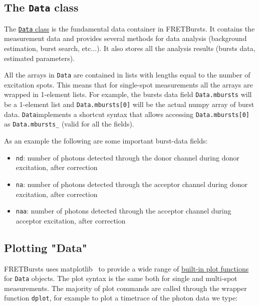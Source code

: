 \subsection{The \texttt{Data} class}
\label{sec:data_intro}

The
\href{http://fretbursts.readthedocs.org/en/latest/data_class.html}{\texttt{Data}
class} is the fundamental data container in FRETBursts. It contains the
measurement data and provides several methods for data analysis (background
estimation, burst search, etc...). It also stores all the analysis results
(bursts data, estimated parameters).

All the arrays in \texttt{Data} are contained in lists with lengths equal to the
number of excitation spots. This means that for single-spot measurements all the
arrays are wrapped in 1-element lists. For example, the bursts data field
\verb|Data.mbursts| will be a 1-element list and \verb|Data.mbursts[0]| will be
the actual numpy array of burst data. \verb|Data|implements a shortcut syntax
that allows accessing 
\verb|Data.mbursts[0]| as \verb|Data.mbursts_| (valid for all the fields).

As an example the following are some important burst-data fields:

\begin{itemize}
\item \verb|nd|: number of photons detected through the donor channel during
donor excitation, after correction
\item \verb|na|: number of photons detected through the acceptor channel during
donor excitation, after correction
\item \verb|naa|: number of photons detected through the acceptor channel during
acceptor excitation, after correction
\end{itemize}

\subsection{Plotting "Data"}

FRETBursts uses matplotlib~\cite{2096e2a4-8f50-4519-bfb3-f796da201630} to
provide a wide range of 
\href{http://fretbursts.readthedocs.org/en/latest/plots.html}{built-in plot functions}
for \verb|Data| objects. 
The plot syntax is the same both for single and multi-spot measurements. 
The majority of plot commands are called through the wrapper function 
\verb|dplot|, for example to plot a timetrace of the photon data we type:

